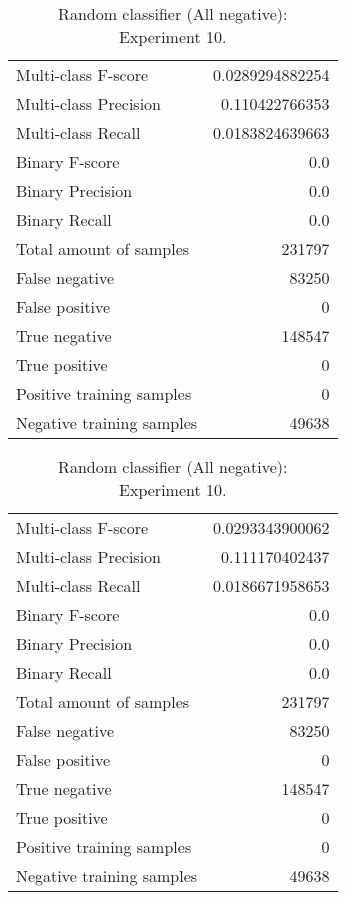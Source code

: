 \begin{table}[H]
\begin{minipage}{0.5\textwidth}
\caption{Random classifier (All negative): \\Experiment 9.}
\centering
\begin{tabular}{l r}
\toprule
Multi-class F-score & 0.0289294882254 \\
Multi-class Precision & 0.110422766353 \\
Multi-class Recall & 0.0183824639663 \\
\midrule
Binary F-score & 0.0 \\
Binary Precision & 0.0 \\
Binary Recall & 0.0 \\
\midrule
Total amount of samples & 231797 \\
False negative & 83250 \\
False positive & 0 \\
True negative & 148547 \\
True positive & 0 \\
\midrule
Positive training samples & 0 \\
Negative training samples & 49638 \\
\bottomrule
\end{tabular}
\end{minipage}
\hfillx
\begin{minipage}{0.5\textwidth}
\caption{Random classifier (All negative): \\Experiment 10.}
\centering
\begin{tabular}{l r}
\toprule
Multi-class F-score & 0.0293343900062 \\
Multi-class Precision & 0.111170402437 \\
Multi-class Recall & 0.0186671958653 \\
\midrule
Binary F-score & 0.0 \\
Binary Precision & 0.0 \\
Binary Recall & 0.0 \\
\midrule
Total amount of samples & 231797 \\
False negative & 83250 \\
False positive & 0 \\
True negative & 148547 \\
True positive & 0 \\
\midrule
Positive training samples & 0 \\
Negative training samples & 49638 \\
\bottomrule
\end{tabular}
\end{minipage}
\end{table}
